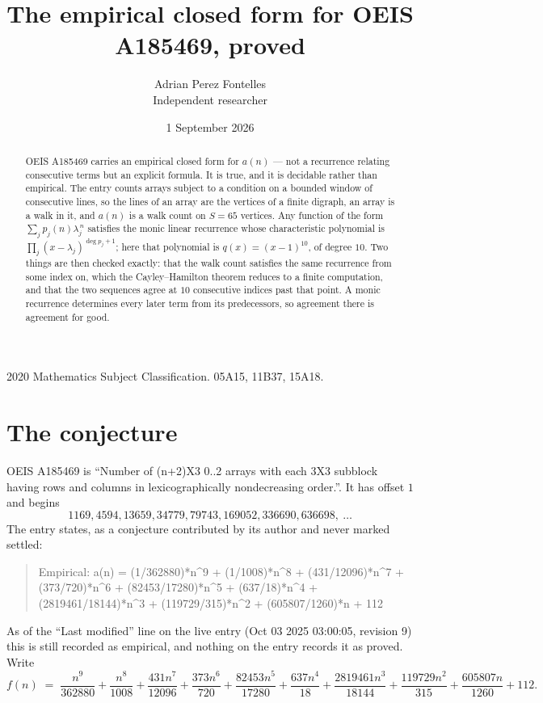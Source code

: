 \documentclass[11pt,a4paper]{article}
\title{The empirical closed form for OEIS A185469, proved}
\author{Adrian Perez Fontelles\\ \small Independent researcher}
\date{1 September 2026}
\theoremstyle{plain}
\theoremstyle{definition}
\begin{document}
\maketitle

\begin{abstract}
OEIS A185469 carries an empirical closed form for $a(n)$ --- not a recurrence relating
consecutive terms but an explicit formula. It is true, and it is decidable rather than
empirical. The entry counts arrays subject to a condition on a bounded window of consecutive lines, so the lines of an array are the
vertices of a finite digraph, an array is a walk in it, and $a(n)$ is a walk count on
$S=65$ vertices. Any function of the form $\sum_j p_j(n)\lambda_j^{\,n}$ satisfies the
monic linear recurrence whose characteristic polynomial is
$\prod_j(x-\lambda_j)^{\deg p_j+1}$; here that polynomial is $q(x)=(x-1)^{10}$, of degree
$10$. Two things are then checked exactly: that the walk count satisfies the same
recurrence from some index on, which the Cayley--Hamilton theorem reduces to a finite
computation, and that the two sequences agree at $10$ consecutive indices past that
point. A monic recurrence determines every later term from its predecessors, so agreement
there is agreement for good.
\end{abstract}

\noindent\small 2020 Mathematics Subject Classification. 05A15, 11B37, 15A18.\normalsize

\section{The conjecture}

OEIS A185469 is ``Number of (n+2)X3 0..2 arrays with each 3X3 subblock having rows and columns in lexicographically nondecreasing order.''. It has offset $1$ and begins
\[
1169, 4594, 13659, 34779, 79743, 169052, 336690, 636698,\ \dots
\]
The entry states, as a conjecture contributed by its author and never marked settled:
\begin{quote}
Empirical: a(n) = (1/362880)*n\^{}9 + (1/1008)*n\^{}8 + (431/12096)*n\^{}7 + (373/720)*n\^{}6 + (82453/17280)*n\^{}5 + (637/18)*n\^{}4 + (2819461/18144)*n\^{}3 + (119729/315)*n\^{}2 + (605807/1260)*n + 112
\end{quote}
As of the ``Last modified'' line on the live entry (Oct 03 2025 03:00:05, revision 9) this is still
recorded as empirical, and nothing on the entry records it as proved. Write
\[
f(n)\;=\;\frac{n^{9}}{362880} + \frac{n^{8}}{1008} + \frac{431 n^{7}}{12096} + \frac{373 n^{6}}{720} + \frac{82453 n^{5}}{17280} + \frac{637 n^{4}}{18} + \frac{2819461 n^{3}}{18144} + \frac{119729 n^{2}}{315} + \frac{605807 n}{1260} + 112.
\]
\end{document}
